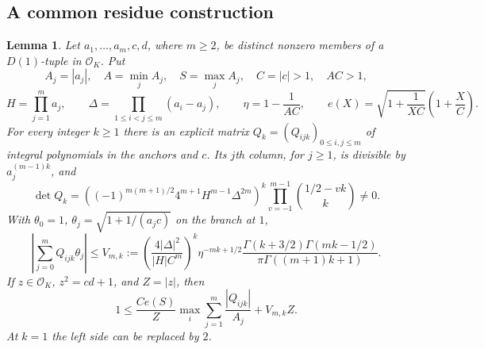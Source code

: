 \documentclass[12pt]{article}
\newtheorem{lemma}[theorem]{Lemma}
\numberwithin{equation}{section}
\begin{document}
\subsection{A common residue construction}

\begin{lemma}\label{lem:ordinary-residue-construction}
Let $a_1,\ldots,a_m,c,d$, where $m\ge2$, be distinct nonzero members of
a $D(1)$-tuple in $\mathcal O_K$.  Put
\[
 A_j=|a_j|,\quad A=\min_j A_j,\quad S=\max_j A_j,
 \quad C=|c|>1,\quad AC>1,
\]
\[
 H=\prod_{j=1}^m a_j,\qquad
 \Delta=\prod_{1\le i<j\le m}(a_i-a_j),\qquad
 \eta=1-\frac1{AC},\qquad
 e(X)=\sqrt{1+\frac1{XC}}\left(1+\frac XC\right).
\]
For every integer $k\ge1$ there is an explicit matrix
$Q_k=(Q_{ijk})_{0\le i,j\le m}$ of integral polynomials in the anchors
and $c$.  Its $j$th column, for $j\ge1$, is divisible by
$a_j^{(m-1)k}$, and
\begin{equation}\label{eq:ordinary-residue-det}
 \det Q_k=
 \left((-1)^{m(m+1)/2}4^{m+1}H^{m-1}\Delta^{2m}\right)^k
 \prod_{v=-1}^{m-1}\binom{1/2-vk}{k}\ne0.
\end{equation}
With $\theta_0=1$, $\theta_j=\sqrt{1+1/(a_jc)}$ on the branch at $1$,
\begin{equation}\label{eq:ordinary-residue-error}
 \left|\sum_{j=0}^mQ_{ijk}\theta_j\right|
 \le V_{m,k}:=
 \left(\frac{4|\Delta|^2}{|H|C^m}\right)^k
 \eta^{-mk+1/2}
 \frac{\Gamma(k+3/2)\Gamma(mk-1/2)}
 {\pi\Gamma((m+1)k+1)}.
\end{equation}
If $z\in\mathcal O_K$, $z^2=cd+1$, and $Z=|z|$, then
\begin{equation}\label{eq:ordinary-root-transfer}
 1\le\frac{Ce(S)}Z
       \max_i\sum_{j=1}^m\frac{|Q_{ijk}|}{A_j}
       +V_{m,k}Z.
\end{equation}
At $k=1$ the left side can be replaced by $2$.
\end{lemma}
\end{document}
